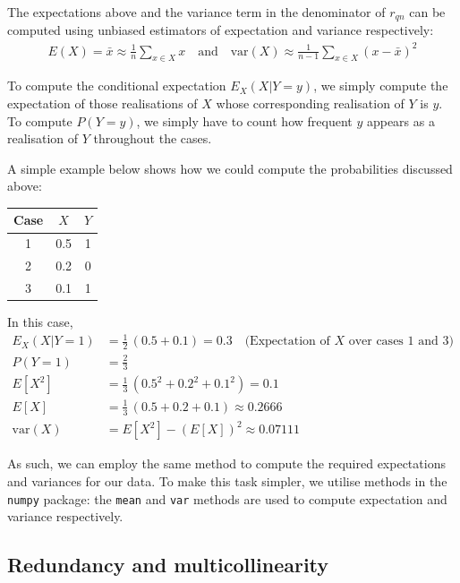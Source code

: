 \documentclass[12pt, twoside, a4paper]{report}
\def\var{\text{var}}
\begin{document}
The expectations above and the variance term in the denominator of $r_{qn}$ can be computed using unbiased estimators of expectation and variance respectively:
\begin{align*}
E(X) = \bar{x} \approx \frac{1}{n} \sum_{x \in X} x \quad \text{and} \quad \var(X) \approx \frac{1}{n-1} \sum_{x \in X} (x- \bar{x})^2
\end{align*}

To compute the conditional expectation $E_X(X|Y=y)$, we simply compute the expectation of those realisations of $X$ whose corresponding realisation of $Y$ is $y$. To compute $P(Y=y)$, we simply have to count how frequent $y$ appears as a realisation of $Y$ throughout the cases.

A simple example below shows how we could compute the probabilities discussed above:

\begin{center}
    \begin{tabular}{| c || c | c |}
    \hline
     Case & $X$ & $Y$ \\ \hline \hline
     1 & 0.5 & 1 \\ \hline
     2 & 0.2 & 0 \\ \hline
     3 & 0.1 & 1 \\ \hline
    \end{tabular}
\end{center}

In this case,
\begin{align*}
E_X(X|Y=1) &= \frac{1}{2} \,  (0.5+0.1) = 0.3 \quad \text{(Expectation of $X$ over cases 1 and 3)} \\
P(Y=1) &= \frac{2}{3} \\
E[X^2] &= \frac{1}{3} \, (0.5^2+0.2^2+0.1^2) = 0.1 \\
E[X] &= \frac{1}{3} \, (0.5+0.2+0.1) \approx 0.2666 \\
\var(X) &= E[X^2] - (E[X])^2 \approx 0.07111
\end{align*}

As such, we can employ the same method to compute the required expectations and variances for our data. To make this task simpler, we utilise methods in the \texttt{numpy} \cite{RefWorks:214} package: the \texttt{mean} and \texttt{var} methods are used to compute expectation and variance respectively.

\subsection{Redundancy and multicollinearity}
\end{document}
